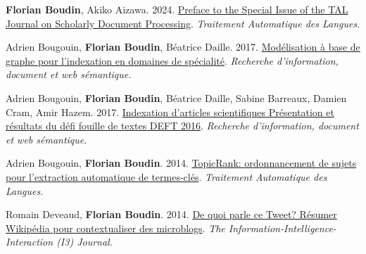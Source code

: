 \item 
\textbf{Florian Boudin}, Akiko Aizawa.
2024.
\href{https://www.atala.org/sites/default/files/TAL_65_2_0.pdf}{Preface to the Special Issue of the TAL Journal on Scholarly Document Processing}.
\textit{Traitement Automatique des Langues}.
\label{boudin-aizawa-2024-preface}

\item 
Adrien Bougouin, \textbf{Florian Boudin}, Béatrice Daille.
2017.
\href{https://www.openscience.fr/IMG/pdf/iste_ridows17v1n2.pdf}{Modélisation à base de graphe pour l’indexation en domaines de spécialité}.
\textit{Recherche d’information, document et web sémantique}.
\label{bougouin-etal-2017-modelisation}

\item 
Adrien Bougouin, \textbf{Florian Boudin}, Béatrice Daille, Sabine Barreaux, Damien Cram, Amir Hazem.
2017.
\href{https://www.openscience.fr/IMG/pdf/iste_ridows17v1n3.pdf}{Indexation d’articles scientifiques Présentation et résultats du défi fouille de textes DEFT 2016}.
\textit{Recherche d’information, document et web sémantique}.
\label{bougouin-etal-2017-indexation}

\item
Adrien Bougouin, \textbf{Florian Boudin}.
2014.
\href{https://aclanthology.org/2014.tal-1.2.pdf}{TopicRank: ordonnancement de sujets pour l’extraction automatique de termes-clés}.
\textit{Traitement Automatique des Langues}.
\label{bougouin-boudin-2014-topicrank}

\item
Romain Deveaud, \textbf{Florian Boudin}.
2014.
\href{https://hal.science/hal-01096926/document}{De quoi parle ce Tweet? Résumer Wikipédia pour contextualiser des microblogs}.
\textit{The Information-Intelligence-Interaction (I3) Journal}.
\label{deveaud-boudin-2014-quoi}